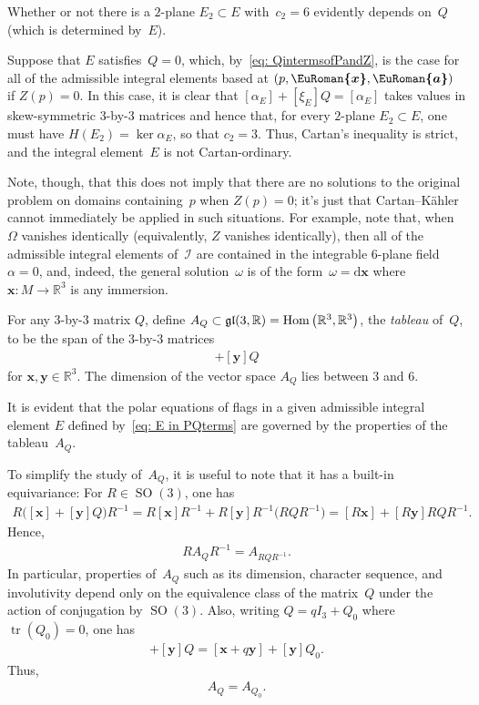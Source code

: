 \documentclass[pdftex]{sigma}
\numberwithin{equation}{section}
\newcommand{\eurom}{\EuRoman}
\renewcommand{\d}{\mathrm{d}}%
\newcommand{\cI}{{\mathcal I}}
\newcommand{\bbR}{{\mathbb R}}
\newcommand{\SO}{\operatorname{SO}}
\newcommand{\eugl}{\operatorname{\frak{gl}}}
\newcommand{\mbx}{\mathbf{x}}
\newcommand{\mby}{\mathbf{y}}
\newcommand{\euroa}{\bm{\eurom{a}}}
\newcommand{\eurox}{\bm{\eurom{x}}}
\DeclareMathOperator{\tr}{tr}
\DeclareMathOperator{\Hom}{Hom}
\begin{document}
Whether or not there is a $2$-plane $E_2\subset E$ with~$c_2 = 6$
evidently depends on~$Q$ (which is determined by~$E$).

\begin{Example}\label{ex: noninvolutivity}
Suppose that $E$ satisfies~$Q = 0$, which, by~\eqref{eq: QintermsofPandZ},
is the case for all of the admissible integral elements based at $(p,\eurox,\euroa)$
if $Z(p) = 0$.
In this case, it is clear that $\left[\alpha_E\right]+\left[\xi_E\right]Q
= \left[\alpha_E\right]$ takes values in skew-symmetric $3$-by-$3$
matrices and hence that, for every $2$-plane $E_2\subset E$,
one must have $H(E_2) = \ker\alpha_E$, so that $c_2=3$.
Thus, Cartan's inequality is strict,
and the integral element~$E$ is not Cartan-ordinary.

Note, though, that this does not imply that there are no solutions
to the original problem on domains containing~$p$ when $Z(p)=0$;
it's just that Cartan--K\"ahler cannot immediately be applied
in such situations. For example, note that,
when~$\Omega$ vanishes identically (equivalently, $Z$ vanishes identically),
then all of the admissible integral elements of~$\cI$
are contained in the integrable $6$-plane field $\alpha = 0$,
and, indeed, the general solution~$\omega$ is of the form~$\omega=\d \mbx$
where $\mbx\colon M\to\bbR^3$ is any immersion.
\end{Example}

For any $3$-by-$3$ matrix $Q$, define $A_Q\subset \eugl(3,\bbR)
= \Hom \big(\bbR^3,\bbR^3\big)$, the \emph{tableau} of~$Q$,
to be the span of the $3$-by-$3$ matrices
\begin{gather*}
[\mbx ]+ [\mby] Q
\end{gather*}
for $\mbx,\mby\in\mathbb{R}^3$.
The dimension of the vector space $A_Q$ lies between $3$ and $6$.

It is evident that the polar equations of flags
in a given admissible integral element $E$
defined by~\eqref{eq: E in PQterms} are governed
by the properties of the tableau~$A_Q$.

To simplify the study of~$A_Q$, it is useful to note that
it has a built-in equivariance:
For $R\in\SO(3)$, one has
\begin{gather*}
R\bigl([\mbx ]+ [\mby] Q\bigr)R^{-1} = R[\mbx]R^{-1}+R[\mby]R^{-1}\big(RQR^{-1}\big) = [R\mbx] + [R\mby] RQR^{-1}.
\end{gather*}
Hence,
\begin{gather*}
R A_Q R^{-1} = A_{RQR^{-1}}.
\end{gather*}
In particular, properties of~$A_Q$ such as its dimension, character sequence, and involutivity depend only on the equivalence class of the matrix~$Q$ under the action of conjugation by $\SO(3)$. Also, writing $Q = q I_3 + Q_0$ where $\tr(Q_0) = 0$, one has
\begin{gather*}
[ \mbx ]+ [\mby ] Q = [ \mbx + q \mby ]+ [\mby ] Q_0 .
\end{gather*}
Thus,
\begin{gather*}
A_Q = A_{Q_0}.
\end{gather*}
\end{document}
